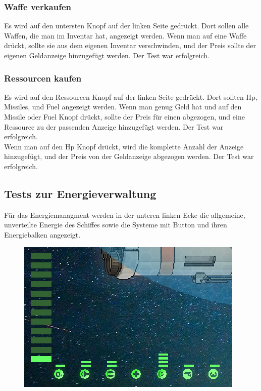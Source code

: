 \documentclass[fontsize=12pt,paper=a4,twoside]{scrartcl}
\begin{document}
\subsubsection{Waffe verkaufen}
Es wird auf den untersten Knopf auf der linken Seite gedrückt. Dort sollen alle Waffen, die man im Inventar hat, angezeigt werden. Wenn man auf eine Waffe drückt, sollte sie aus dem eigenen Inventar verschwinden, und der Preis sollte der eigenen Geldanzeige hinzugefügt werden.  Der Test war erfolgreich. \\
\subsubsection{Ressourcen kaufen}
Es wird auf den Ressourcen Knopf auf der linken Seite gedrückt. Dort sollten Hp, Missiles, und Fuel angezeigt werden. Wenn man genug Geld hat und auf den Missile oder Fuel Knopf drückt, sollte der Preis für einen abgezogen, und eine Ressource zu der passenden Anzeige hinzugefügt werden.  Der Test war erfolgreich. \\
Wenn man auf den Hp Knopf drückt, wird die komplette Anzahl der Anzeige hinzugefügt, und der Preis von der Geldanzeige abgezogen werden.  Der Test war erfolgreich. \\



\subsection{Tests zur Energieverwaltung}
Für das Energiemanagment werden in der unteren linken Ecke die allgemeine, unverteilte Energie des Schiffes sowie die Systeme mit Button und ihren Energiebalken angezeigt. \\
\begin{figure}[h!]
\centering
\includegraphics[width=0.5\linewidth]{images/energy1.png}
\end{figure}
\end{document}
